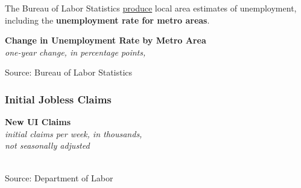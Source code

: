 \documentclass{report}
\makeatletter
\newcommand{\tbllink}[1]{\href{https://raw.githubusercontent.com/bdecon/US-chartbook/master/chartbook/data/#1}{\faTable}}
\newcommand*\short[1]{\expandafter\@gobbletwo\number\numexpr#1\relax}
\newcommand{\ltdateaxisticks}{
		date coordinates in=x, axis line style={draw=none},
		xmax={2020-07-01},
		max space between ticks=40,	    
		xtick={{2015-01-01}, {2016-01-01}, {2017-01-01}, {2018-01-01}, 
		    {2019-01-01}, {2020-01-01}},
		enlarge y limits={0.06}, enlarge x limits={0.01},
		}
\newcommand{\bbar}[2]{extra #1 ticks = {{#2}}, extra #1 tick labels = ,
		extra #1 tick style = {grid=major, grid style={thick, black!25}},}
\newcommand{\stdline}[4]{\addplot[very thick, no markers, color=#1] 
		table [x=#2, y=#3, col sep=comma] {#4};	}
\newcommand{\rbars}{
		\fill[color=black!10] (axis cs:{1990-07-01},\pgfkeysvalueof{/pgfplots/ymin}) rectangle 
			(axis cs:{1991-03-01}, \pgfkeysvalueof{/pgfplots/ymax});
		\fill[color=black!10] (axis cs:{2007-12-01},\pgfkeysvalueof{/pgfplots/ymin}) rectangle 
			(axis cs:{2009-07-01}, \pgfkeysvalueof{/pgfplots/ymax});
		\fill[color=black!10] (axis cs:{2001-03-01},\pgfkeysvalueof{/pgfplots/ymin}) rectangle 
			(axis cs:{2001-11-01}, \pgfkeysvalueof{/pgfplots/ymax});}
\makeatother
\begin{document}
{{{{{{{{{\begin{minipage}{0.76\textwidth}
\small The Bureau of Labor Statistics \href{https://www.bls.gov/lau/}{produce} local area estimates of unemployment, including the \textbf{unemployment rate for metro areas}. \\

\vspace{2mm}

\noindent \normalsize \textbf{Change in Unemployment Rate by Metro Area}\\
\footnotesize{\textit{one-year change, in percentage points, }}\\

\vspace{-2mm}

\hspace*{-15mm} 

\vspace{-2mm}

\footnotesize{Source: Bureau of Labor Statistics}

\end{minipage}

\newpage


\subsubsection*{\color{black!70} \seriffont Initial Jobless Claims}

\begin{minipage}{0.76\textwidth}

\small 
\end{minipage}
\vspace{2mm}

\begin{minipage}{0.32\textwidth}
\noindent \normalsize \textbf{New UI Claims}\\
\footnotesize{\textit{initial claims per week, in thousands,}}\\
\footnotesize{\textit{not seasonally adjusted}}\\
\noindent \hspace*{-2mm} \\
\footnotesize{Source: Department of Labor} \hfill \tbllink{icsa.csv}
\end{minipage}

}}}}}}}}}
\end{document}
